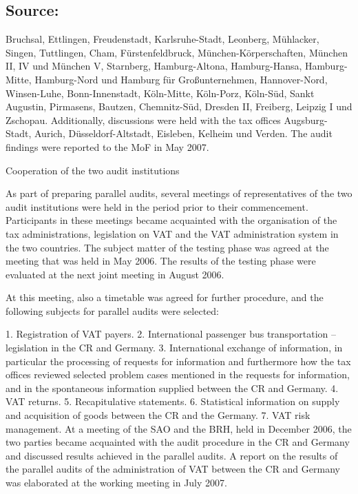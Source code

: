 \documentclass[10pt]{article}
\begin{document}
\subsection*{Source:}

Bruchsal, Ettlingen, Freudenstadt, Karlsruhe-Stadt, Leonberg, Mühlacker, Singen, Tuttlingen, Cham, Fürstenfeldbruck, München-Körperschaften, München II, IV und München V, Starnberg, Hamburg-Altona, Hamburg-Hansa, Hamburg-Mitte, Hamburg-Nord und Hamburg für Großunternehmen, Hannover-Nord, Winsen-Luhe, Bonn-Innenstadt, Köln-Mitte, Köln-Porz, Köln-Süd, Sankt Augustin, Pirmasens, Bautzen, Chemnitz-Süd, Dresden II, Freiberg, Leipzig I und Zschopau.
Additionally, discussions were held with the tax offices Augsburg-Stadt, Aurich, Düsseldorf-Altstadt, Eisleben, Kelheim und Verden.
The audit findings were reported to the MoF in May 2007.


Cooperation of the two audit institutions

As part of preparing parallel audits, several meetings of representatives of the two audit institutions were held in the period prior to their commencement.
Participants in these meetings became acquainted with the organisation of the tax administrations, legislation on VAT and the VAT administration system in the two countries.
The subject matter of the testing phase was agreed at the meeting that was held in May 2006.
The results of the testing phase were evaluated at the next joint meeting in August 2006.


At this meeting, also a timetable was agreed for further procedure, and the following subjects for parallel audits were selected:

1. Registration of VAT payers.
2.
International passenger bus transportation – legislation in the CR and Germany.
3. International exchange of information, in particular the processing of requests for information and furthermore how the tax offices reviewed selected problem cases mentioned in the requests for information, and in the spontaneous information supplied between the CR and Germany.
4. VAT returns.
5.
Recapitulative statements.
6.
Statistical information on supply and acquisition of goods between the CR and the Germany.
7. VAT risk management.
At a meeting of the SAO and the BRH, held in December 2006, the two parties became acquainted with the audit procedure in the CR and Germany and discussed results achieved in the parallel audits.
A report on the results of the parallel audits of the administration of VAT between the CR and Germany was elaborated at the working meeting in July 2007.
\end{document}
